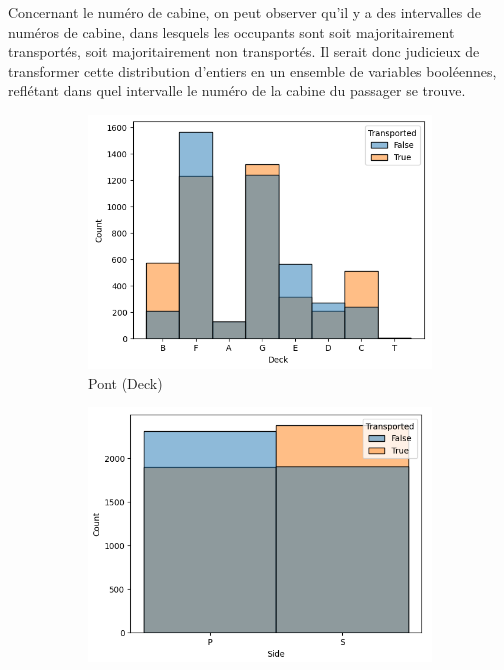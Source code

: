 \documentclass[a4paper]{article}
\begin{document}
    Concernant le numéro de cabine, on peut observer qu'il y a des intervalles de numéros de cabine, dans lesquels 
    les occupants sont soit majoritairement transportés, soit majoritairement non transportés.
    Il serait donc judicieux de transformer cette distribution d'entiers en un ensemble de variables booléennes,
    reflétant dans quel intervalle le numéro de la cabine du passager se trouve.

    \begin{figure}
        \centering
        \begin{subfigure}{.5\textwidth}
            \centering
            \includegraphics[width=\linewidth]{images/Figure 7.png}
            \caption{Pont (Deck)}
        \end{subfigure}%
        \begin{subfigure}{.5\textwidth}
            \centering
            \includegraphics[width=\linewidth]{images/Figure 8.png}

\end{subfigure}
\end{figure}
\end{document}
